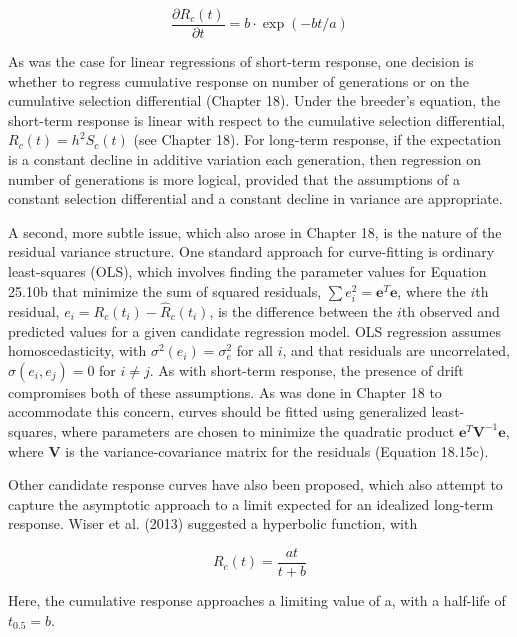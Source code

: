 \documentclass{article}
\begin{document}
\begin{equation}
\frac{\partial R_{c}(t)}{\partial t}=b\cdot\exp(-b t/a)
\tag{25.10d}
\label{eq:25_10d}
\end{equation}

As was the case for linear regressions of short-term response, one decision is whether to regress cumulative response on number of generations or on the cumulative selection differential (Chapter 18). Under the breeder's equation, the short-term response is linear with respect to the cumulative selection differential,  $ R_c(t) = h^2 S_c(t) $ (see Chapter 18). For long-term response, if the expectation is a constant decline in additive variation each generation, then regression on number of generations is more logical, provided that the assumptions of a constant selection differential and a constant decline in variance are appropriate.

A second, more subtle issue, which also arose in Chapter 18, is the nature of the residual variance structure. One standard approach for curve-fitting is ordinary least-squares (OLS), which involves finding the parameter values for Equation 25.10b that minimize the sum of squared residuals,  $ \sum e_i^2 = \mathbf{e}^T \mathbf{e} $, where the  $ i $th residual,  $ e_i = R_c(t_i) - \hat{R}_c(t_i) $, is the difference between the  $ i $th observed and predicted values for a given candidate regression model. OLS regression assumes homoscedasticity, with  $ \sigma^2(e_i) = \sigma_e^2 $ for all  $ i $, and that residuals are uncorrelated,  $ \sigma(e_i, e_j) = 0 $ for  $ i \neq j $. As with short-term response, the presence of drift compromises both of these assumptions. As was done in Chapter 18 to accommodate this concern, curves should be fitted using generalized least-squares, where parameters are chosen to minimize the quadratic product  $ \mathbf{e}^T \mathbf{V}^{-1} \mathbf{e} $, where  $ \mathbf{V} $ is the variance-covariance matrix for the residuals (Equation 18.15c).

Other candidate response curves have also been proposed, which also attempt to capture the asymptotic approach to a limit expected for an idealized long-term response. Wiser et al. (2013) suggested a hyperbolic function, with

\begin{equation}
R_{c}(t)=\frac{a t}{t+b}
\tag{25.11a}
\label{eq:25_11a}
\end{equation}

Here, the cumulative response approaches a limiting value of a, with a half-life of  $ t_{0.5} = b $.
\end{document}
